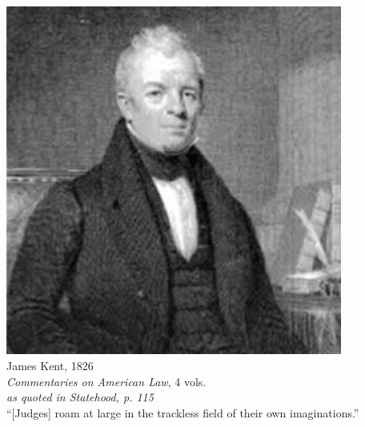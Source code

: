 \begin{frame}
    \begin{columns}[onlytextwidth]
            \centering
            \includegraphics[width=0.95\textwidth]{img/james-kent.png} \\
            James Kent, 1826 \\
            \emph{Commentaries on American Law}, 4 vols. \\
            \small{\emph{as quoted in Statehood, p. 115}} \\

            { \large ``[Judges] roam at large in the trackless field of their own imaginations.''}
    \end{columns}
\end{frame}

